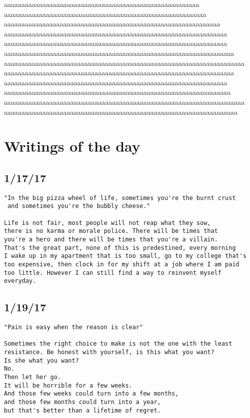 \documentclass[12pt,letterpaper]{article}
\begin{document}
aaaaaaaaaaaaaaaaaaaaaaaaaaaaaaaaaaaaaaaaaaaaaaaaaaaaaaaa aaaaaaaaaaaaaaaaaaaaaaaaaaaaaaaaaaaaaaaaaaaaaaaaaaaaaaaaaa aaaaaaaaaaaaaaaaaaaaaaaaaaaaaaaaaaaaaaaaaaaaaaaaaaaaaaaaaaaaaa aaaaaaaaaaaaaaaaaaaaaaaaaaaaaaaaaaaaaaaaaaaaaaaaaaaaaaaaaaaaaaaa aaaaaaaaaaaaaaaaaaaaaaaaaaaaaaaaaaaaaaaaaaaaaaaaaaaaaaaaaaaaaaaa aaaaaaaaaaaaaaaaaaaaaaaaaaaaaaaaaaaaaaaaaaaaaaaaaaaaaaaaaaaaaaaaaa aaaaaaaaaaaaaaaaaaaaaaaaaaaaaaaaaaaaaaaaaaaaaaaaaaaaaaaaaaaaaaaaaaaaa aaaaaaaaaaaaaaaaaaaaaaaaaaaaaaaaaaaaaaaaaaaaaaaaaaaaaaaaaaaaaaaaaa aaaaaaaaaaaaaaaaaaaaaaaaaaaaaaaaaaaaaaaaaaaaaaaaaaaaaaaaaaaaaaaa aaaaaaaaaaaaaaaaaaaaaaaaaaaaaaaaaaaaaaaaaaaaaaaaaaaaaaaaaaaaaaaaa aaaaaaaaaaaaaaaaaaaaaaaaaaaaaaaaaaaaaaaaaaaaaaaaaaaaaaaaaaaaaaaaaaaaa aaaaaaaaaaaaaaaaaaaaaaaaaaaaaaaaaaaaaaaaaaaaaaaaaaaaaaaaaaaaaaaaaaa
\newpage
\section{Writings of the day}
\subsection*{1/17/17}
\begin{verbatim}
"In the big pizza wheel of life, sometimes you're the burnt crust
 and sometimes you're the bubbly cheese."

Life is not fair, most people will not reap what they sow, 
there is no karma or morale police. There will be times that
you're a hero and there will be times that you're a villain.
That's the great part, none of this is predestined, every morning 
I wake up in my apartment that is too small, go to my college that's
too expensive, then clock in for my shift at a job where I am paid 
too little. However I can still find a way to reinvent myself everyday.
\end{verbatim}


\subsection*{1/19/17}
\begin{verbatim}
"Pain is easy when the reason is clear"

Sometimes the right choice to make is not the one with the least
resistance. Be honest with yourself, is this what you want?
Is she what you want?
No. 
Then let her go. 
It will be horrible for a few weeks.
And those few weeks could turn into a few months, 
and those few months could turn into a year,
but that's better than a lifetime of regret. 
\end{verbatim}
\end{document}
